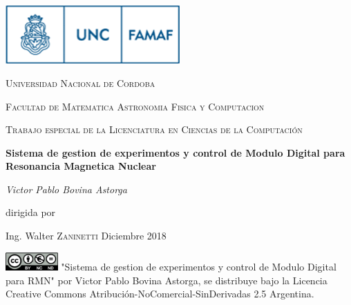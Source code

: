

\begin{titlepage}
	\centering
	\includegraphics[width=0.50\textwidth]{../figures/famaf-logo.png}\par\vspace{1cm}
    {\scshape\LARGE Universidad Nacional de Cordoba \par}
    {\scshape\LARGE Facultad de Matematica Astronomia Fisica y Computacion \par}
	\vspace{1cm}
	{\scshape\Large Trabajo especial de la Licenciatura en
    Ciencias de la Computación\par}
	\vspace{1.5cm}
	{\huge \textbf{Sistema de gestion de experimentos y control de Modulo Digital para Resonancia Magnetica Nuclear}\par}
	\vspace{2cm}
	{\Large\itshape Victor Pablo Bovina Astorga\par}
	\vfill
    dirigida por \par 
    Ing. Walter \textsc{Zaninetti}
    \vfill
    Diciembre 2018
    \vfill

\includegraphics[width=0.15\textwidth]{../figures/cc.png}
\vfill
{\tiny "Sistema de gestion de experimentos y control de Modulo Digital para RMN" por Victor Pablo Bovina Astorga, se distribuye bajo la Licencia Creative Commons
Atribución-NoComercial-SinDerivadas 2.5 Argentina.}
\end{titlepage}